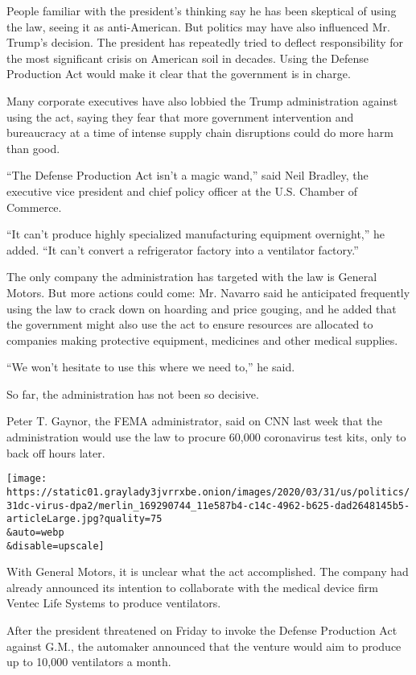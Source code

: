 People familiar with the president's thinking say he has been skeptical
of using the law, seeing it as anti-American. But politics may have also
influenced Mr. Trump's decision. The president has repeatedly tried to
deflect responsibility for the most significant crisis on American soil
in decades. Using the Defense Production Act would make it clear that
the government is in charge.

Many corporate executives have also lobbied the Trump administration
against using the act, saying they fear that more government
intervention and bureaucracy at a time of intense supply chain
disruptions could do more harm than good.

``The Defense Production Act isn't a magic wand,'' said Neil Bradley,
the executive vice president and chief policy officer at the U.S.
Chamber of Commerce.

``It can't produce highly specialized manufacturing equipment
overnight,'' he added. ``It can't convert a refrigerator factory into a
ventilator factory.''

The only company the administration has targeted with the law is General
Motors. But more actions could come: Mr. Navarro said he anticipated
frequently using the law to crack down on hoarding and price gouging,
and he added that the government might also use the act to ensure
resources are allocated to companies making protective equipment,
medicines and other medical supplies.

``We won't hesitate to use this where we need to,'' he said.

So far, the administration has not been so decisive.

Peter T. Gaynor, the FEMA administrator, said on CNN last week that the
administration would use the law to procure 60,000 coronavirus test
kits, only to back off hours later.

\texttt{[image: https://static01.graylady3jvrrxbe.onion/images/2020/03/31/us/politics/31dc-virus-dpa2/merlin\_169290744\_11e587b4-c14c-4962-b625-dad2648145b5-articleLarge.jpg?quality=75\\\&auto=webp\\\&disable=upscale]}

With General Motors, it is unclear what the act accomplished. The
company had already announced its intention to collaborate with the
medical device firm Ventec Life Systems to produce ventilators.

After the president threatened on Friday to invoke the Defense
Production Act against G.M., the automaker announced that the venture
would aim to produce up to 10,000 ventilators a month.

